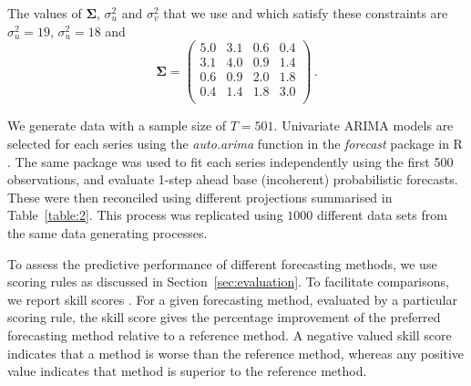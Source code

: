 \documentclass[a4paper, 11pt]{article}
\theoremstyle{definition}
\begin{document}
The values of $\bm{\Sigma}$, $\sigma^2_u$ and $\sigma^2_v$ that we use and which satisfy these constraints are $\sigma^2_u = 19$, $\sigma^2_u = 18$ and
\[
\bm{\Sigma} =
\begin{pmatrix}
5.0 & 3.1 & 0.6 & 0.4 \\
3.1 & 4.0 & 0.9 & 1.4 \\
0.6 & 0.9 & 2.0 & 1.8 \\
0.4 & 1.4 & 1.8 & 3.0 \\
\end{pmatrix}\,.
\]

We generate data with a sample size of $T=501$. Univariate ARIMA models are selected for each series using the \textit{auto.arima} function in the \textit{forecast} package \citep{hyndman2017forecasting} in R \citep{Rcore}. The same package was used to fit each series independently using the first 500 observations, and evaluate 1-step ahead base (incoherent) probabilistic forecasts. These were then reconciled using different projections summarised in Table~\ref{table:2}. This process was replicated using $1000$ different data sets from the same data generating processes.

To assess the predictive performance of different forecasting methods, we use scoring rules as discussed in Section~\ref{sec:evaluation}. To facilitate comparisons, we report skill scores \citep{Gneiting2007}. For a given forecasting method, evaluated by a particular scoring rule, the skill score %
gives the percentage improvement of the preferred forecasting method relative to a reference method. A negative valued skill score indicates that a method is worse than the reference method, whereas any positive value indicates that method is superior to the reference method.
\end{document}
